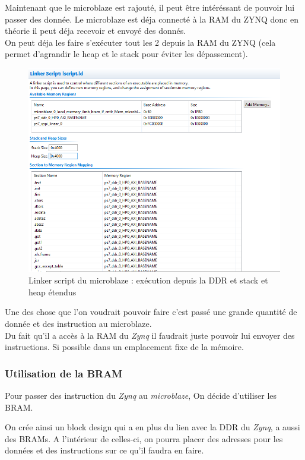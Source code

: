 \documentclass[12pt,a4paper]{ieee}
\begin{document}
Maintenant que le microblaze est rajouté, il peut être intéréssant de pouvoir lui passer des donnée. Le microblaze est déja connecté à la RAM du ZYNQ donc en théorie il peut déja recevoir et envoyé des donnés.\\
On peut déja les faire s'exécuter tout les 2 depuis la RAM du ZYNQ (cela permet d'agrandir le heap et le stack pour éviter les dépassement).
\begin{figure}[H]
	\centering
		\includegraphics[width=\linewidth]{im/mb2.png}	
	\caption{Linker script du microblaze : exécution depuis la DDR et stack et heap étendus}
	\label{fig-link}
\end{figure}

Une des chose que l'on voudrait pouvoir faire c'est passé une grande quantité de donnée et des instruction au microblaze.\\
Du fait qu'il a accès à la RAM du \textit{Zynq} il faudrait juste pouvoir lui envoyer des instructions. Si possible dans un emplacement fixe de la mémoire.
\subsubsection{Utilisation de la BRAM}
Pour passer des instruction du \textit{Zynq} au \textit{microblaze}, On décide d'utiliser les BRAM.

On crée ainsi un block design qui a en plus du lien avec la DDR du \textit{Zynq}, a aussi des BRAMs. A l'intérieur de celles-ci, on pourra placer des adresses pour les données et des instructions sur ce qu'il faudra en faire.
\end{document}
